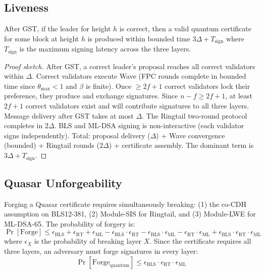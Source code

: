 \subsection{Liveness}

\begin{theorem}[Liveness]
\label{thm:liveness}
After GST, if the leader for height $h$ is correct, then a valid quantum
certificate for some block at height $h$ is produced within bounded time
$3\Delta + T_{\mathrm{sign}}$ where $T_{\mathrm{sign}}$ is the maximum
signing latency across the three layers.
\end{theorem}

\begin{proof}[Proof sketch]
After GST, a correct leader's proposal reaches all correct validators within
$\Delta$. Correct validators execute Wave (FPC rounds complete in bounded time
since $\theta_{\max} < 1$ and $\beta$ is finite). Once $\geq 2f+1$ correct
validators lock their preference, they produce and exchange signatures. Since
$n - f \geq 2f+1$, at least $2f+1$ correct validators exist and will
contribute signatures to all three layers. Message delivery after GST takes at
most $\Delta$. The Ringtail two-round protocol completes in $2\Delta$.
BLS and ML-DSA signing is non-interactive (each validator signs independently).
Total: proposal delivery ($\Delta$) + Wave convergence (bounded) + Ringtail
rounds ($2\Delta$) + certificate assembly. The dominant term is $3\Delta +
T_{\mathrm{sign}}$.
\end{proof}

\subsection{Quasar Unforgeability}

\begin{theorem}
\label{thm:unforgeability}
Forging a Quasar certificate requires simultaneously breaking: (1) the
co-CDH assumption on BLS12-381, (2) Module-SIS for Ringtail, and (3)
Module-LWE for ML-DSA-65. The probability of forgery is:
\[
\Pr[\mathrm{Forge}] \leq \epsilon_{\mathrm{BLS}} +
\epsilon_{\mathrm{RT}} + \epsilon_{\mathrm{ML}} -
\epsilon_{\mathrm{BLS}} \cdot \epsilon_{\mathrm{RT}} -
\epsilon_{\mathrm{BLS}} \cdot \epsilon_{\mathrm{ML}} -
\epsilon_{\mathrm{RT}} \cdot \epsilon_{\mathrm{ML}} +
\epsilon_{\mathrm{BLS}} \cdot \epsilon_{\mathrm{RT}} \cdot
\epsilon_{\mathrm{ML}}
\]
where $\epsilon_X$ is the probability of breaking layer $X$. Since the
certificate requires all three layers, an adversary must forge signatures
in every layer:
\[
\Pr[\mathrm{Forge}_{\mathrm{quantum}}] \leq
\epsilon_{\mathrm{BLS}} \cdot \epsilon_{\mathrm{RT}} \cdot
\epsilon_{\mathrm{ML}}
\]
\end{theorem}

